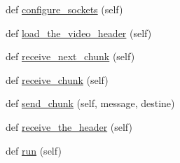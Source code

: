 \begin{DoxyCompactItemize}
\item 
def \hyperlink{classsrc_1_1core_1_1splitter__ims_1_1Splitter__IMS_a88b053217e3e4657062043f644fc4c3a}{configure\+\_\+sockets} (self)
\item 
def \hyperlink{classsrc_1_1core_1_1splitter__ims_1_1Splitter__IMS_a1c0b2222975b7e43080337f97904cff1}{load\+\_\+the\+\_\+video\+\_\+header} (self)
\item 
def \hyperlink{classsrc_1_1core_1_1splitter__ims_1_1Splitter__IMS_ab440ec22104aa94f3c436fd93e385262}{receive\+\_\+next\+\_\+chunk} (self)
\item 
def \hyperlink{classsrc_1_1core_1_1splitter__ims_1_1Splitter__IMS_a7890854942cd06c1826351dfe964ace1}{receive\+\_\+chunk} (self)
\item 
def \hyperlink{classsrc_1_1core_1_1splitter__ims_1_1Splitter__IMS_a28035c3e798ff257fd558594a383ea16}{send\+\_\+chunk} (self, message, destine)
\item 
def \hyperlink{classsrc_1_1core_1_1splitter__ims_1_1Splitter__IMS_a7c76103042da1b145ffedb1d7923c741}{receive\+\_\+the\+\_\+header} (self)
\item 
def \hyperlink{classsrc_1_1core_1_1splitter__ims_1_1Splitter__IMS_a2a286adc311b76b64a58b8c87966bd73}{run} (self)
\end{DoxyCompactItemize}
